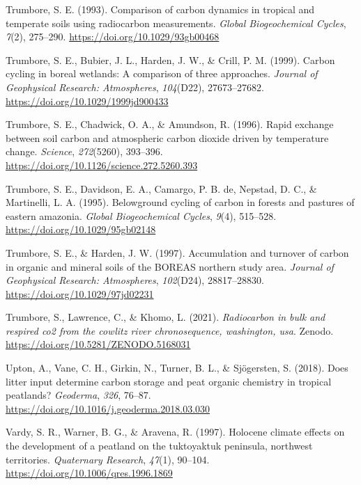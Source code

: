 \documentclass[]{article}
\begin{document}
\leavevmode\hypertarget{ref-Trumbore_1993}{}%
Trumbore, S. E. (1993). Comparison of carbon dynamics in tropical and
temperate soils using radiocarbon measurements. \emph{Global
Biogeochemical Cycles}, \emph{7}(2), 275--290.
\url{https://doi.org/10.1029/93gb00468}

\leavevmode\hypertarget{ref-Trumbore_1999}{}%
Trumbore, S. E., Bubier, J. L., Harden, J. W., \& Crill, P. M. (1999).
Carbon cycling in boreal wetlands: A comparison of three approaches.
\emph{Journal of Geophysical Research: Atmospheres}, \emph{104}(D22),
27673--27682. \url{https://doi.org/10.1029/1999jd900433}

\leavevmode\hypertarget{ref-Trumbore_1996}{}%
Trumbore, S. E., Chadwick, O. A., \& Amundson, R. (1996). Rapid exchange
between soil carbon and atmospheric carbon dioxide driven by temperature
change. \emph{Science}, \emph{272}(5260), 393--396.
\url{https://doi.org/10.1126/science.272.5260.393}

\leavevmode\hypertarget{ref-Trumbore_1995}{}%
Trumbore, S. E., Davidson, E. A., Camargo, P. B. de, Nepstad, D. C., \&
Martinelli, L. A. (1995). Belowground cycling of carbon in forests and
pastures of eastern amazonia. \emph{Global Biogeochemical Cycles},
\emph{9}(4), 515--528. \url{https://doi.org/10.1029/95gb02148}

\leavevmode\hypertarget{ref-Trumbore_1997}{}%
Trumbore, S. E., \& Harden, J. W. (1997). Accumulation and turnover of
carbon in organic and mineral soils of the BOREAS northern study area.
\emph{Journal of Geophysical Research: Atmospheres}, \emph{102}(D24),
28817--28830. \url{https://doi.org/10.1029/97jd02231}

\leavevmode\hypertarget{ref-https:ux2fux2fdoi.orgux2f10.5281ux2fzenodo.5168031}{}%
Trumbore, S., Lawrence, C., \& Khomo, L. (2021). \emph{Radiocarbon in
bulk and respired co2 from the cowlitz river chronosequence, washington,
usa}. Zenodo. \url{https://doi.org/10.5281/ZENODO.5168031}

\leavevmode\hypertarget{ref-Upton_2018}{}%
Upton, A., Vane, C. H., Girkin, N., Turner, B. L., \& Sjögersten, S.
(2018). Does litter input determine carbon storage and peat organic
chemistry in tropical peatlands? \emph{Geoderma}, \emph{326}, 76--87.
\url{https://doi.org/10.1016/j.geoderma.2018.03.030}

\leavevmode\hypertarget{ref-Vardy_1997}{}%
Vardy, S. R., Warner, B. G., \& Aravena, R. (1997). Holocene climate
effects on the development of a peatland on the tuktoyaktuk peninsula,
northwest territories. \emph{Quaternary Research}, \emph{47}(1),
90--104. \url{https://doi.org/10.1006/qres.1996.1869}
\end{document}

